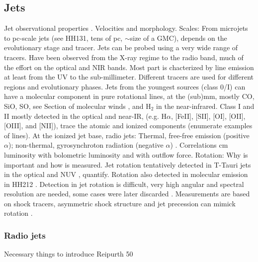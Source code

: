 \documentclass[12pt]{mythesis}
\begin{document}
\subsection{Jets}
Jet observational properties \citep{reipurth2001, frank2014, anglada2018, ray2021}.
Velocities and morphology.
Scales: From microjets to pc-scale jets (see HH131, tens of pc, $\sim$size of a GMC), depends on the evolutionary stage and tracer.
Jets can be probed using a very wide range of tracers.
Have been observed from the X-ray regime to the radio band, much of the effort on the optical and NIR bands. Most part is chacterized by line emission at least from the UV to the sub-millimeter. Different tracers are used for different regions and evolutionary phases.
Jets from the youngest sources (class 0/I) can have a molecular component in pure rotational lines, at the (sub)mm, mostly CO, SiO, SO, see Section of molecular winds %
, and H$_2$ in the near-infrared.
Class I and II mostly detected in the optical and near-IR, (e.g. H$\alpha$, [FeII], [SII], [OI], [OII], [OIII], and [NII]), trace the atomic and ionized components (enumerate examples of lines).
At the ionized jet base, radio jets: Thermal, free-free emission (positive $\alpha$); non-thermal, gyrosynchroton radiation (negative $\alpha$) \citep{anglada2018}. Correlations cm luminosity with bolometric luminosity and with outflow force.
Rotation: Why is important and how is measured. Jet rotation tentatively detected in T-Tauri jets in the optical and NUV \citep{bacciotti2002,coffey2007}, quantify. Rotation also detected in molecular emission in HH212 \citep[the clearest example, I think, since the jet is nearly contained in the plane-of-sky][]{lee2017}. Detection in jet rotation is difficult, very high angular and spectral resolution are needed, some cases were later discarded \citep{coffey2012}. Measurements are based on shock tracers, asymmetric shock structure and jet precession can mimick rotation \citep{erkal2021}.

%

\subsubsection{Radio jets}

Necessary things to introduce Reipurth 50 \citep{anglada2018}
\end{document}
